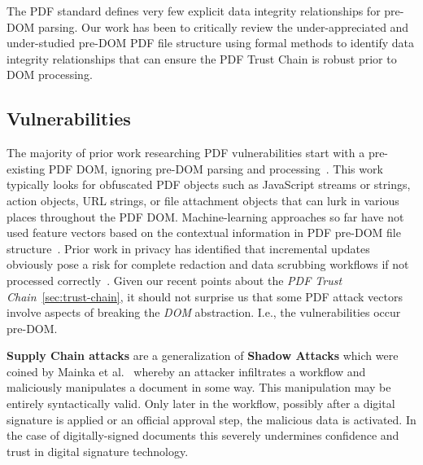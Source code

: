 The PDF standard defines very few explicit data integrity relationships for pre-DOM parsing. 
Our work has been to critically review the under-appreciated and under-studied pre-DOM PDF
file structure using formal methods to identify data integrity relationships that can 
ensure the PDF Trust Chain is robust prior to DOM processing.

\subsection{Vulnerabilities}
\label{sec:vulnerabilities}


The majority of prior work researching PDF vulnerabilities start with a pre-existing PDF DOM,
ignoring pre-DOM parsing and processing~\cite{smutzMaliciousPDFDetection2012,liuDetectingMaliciousJavascript2014,iwamotoStudyMaliciousPDF2016}. 
This work typically looks for obfuscated PDF objects such as
JavaScript streams or strings, action objects, URL strings, or file attachment objects that 
can lurk in various places throughout the PDF DOM. Machine-learning approaches so far have not  
used feature vectors based on the contextual information in PDF pre-DOM file structure~\cite{andrewmangleAnalysisMachineLearning2021,manharmohammedHAPSSAHolisticApproach2021}. 
Prior work in privacy has identified that incremental updates obviously pose a risk for complete
redaction and data scrubbing workflows if not processed correctly~\cite{adhataraoHowArePDF2021,y.fengSystematicMethodPDF2018}.
Given our recent points about the \emph{PDF Trust Chain}~\cref{sec:trust-chain}, it should not 
surprise us that some PDF attack vectors involve aspects of breaking the \emph{DOM} abstraction.
I.e., the vulnerabilities occur pre-DOM.

{\bf{Supply Chain attacks}} are a generalization of {\bf{Shadow Attacks}} which were coined by Mainka 
et al.~\cite{mainkaShadowAttacksHiding2021} whereby an attacker infiltrates a workflow and 
maliciously manipulates a document in some way. This manipulation may be entirely syntactically valid.
Only later in the workflow, possibly after a 
digital signature is applied or an official approval step, the malicious data is 
activated. In the case of digitally-signed documents this severely undermines confidence and trust
in digital signature technology.

